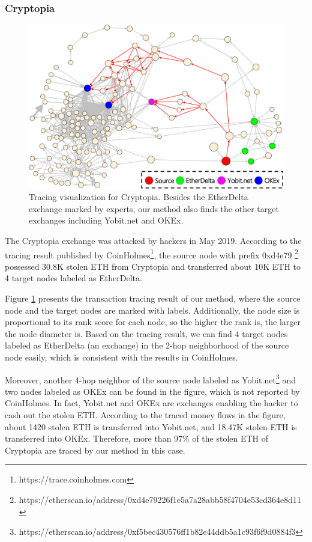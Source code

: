 \subsubsection{Cryptopia}\label{sec:case_study_Cryptopia}
\begin{figure}[t]
    \centering
    \includegraphics[width=0.8\linewidth]{figures/cryptopia.pdf}
    \caption{Tracing visualization for Cryptopia. Besides the EtherDelta exchange marked by experts, our method also finds the other target exchanges including Yobit.net and OKEx.}
    \label{fig:ttr_example_cryptopia}
\end{figure}
The Cryptopia exchange was attacked by hackers in May 2019.
According to the tracing result published by CoinHolmes\footnote{https://trace.coinholmes.com}, the source node with prefix 0xd4e79 \footnote{https://etherscan.io/address/0xd4e79226f1e5a7a28abb58f4704e53cd364e8d11} possessed 30.8K stolen ETH from Cryptopia and transferred about 10K ETH to 4 target nodes labeled as EtherDelta.

Figure \ref{fig:ttr_example_cryptopia} presents the transaction tracing result of our method, where the source node and the target nodes are marked with labels. 
Additionally, the node size is proportional to its rank score for each node, so the higher the rank is, the larger the node diameter is.
Based on the tracing result, we can find 4 target nodes labeled as EtherDelta (an exchange) in the 2-hop neighborhood of the source node easily, which is consistent with the results in CoinHolmes.

Moreover, another 4-hop neighbor of the source node labeled as Yobit.net\footnote{https://etherscan.io/address/0xf5bec430576ff1b82e44ddb5a1c93f6f9d0884f3} and two nodes labeled as OKEx can be found in the figure, which is not reported by CoinHolmes.
In fact, Yobit.net and OKEx are exchanges enabling the hacker to cash out the stolen ETH.
According to the traced money flows in the figure, about 1420 stolen ETH is transferred into Yobit.net, and 18.47K stolen ETH is transferred into OKEx.
Therefore, more than 97\% of the stolen ETH of Cryptopia are traced by our method in this case. 

